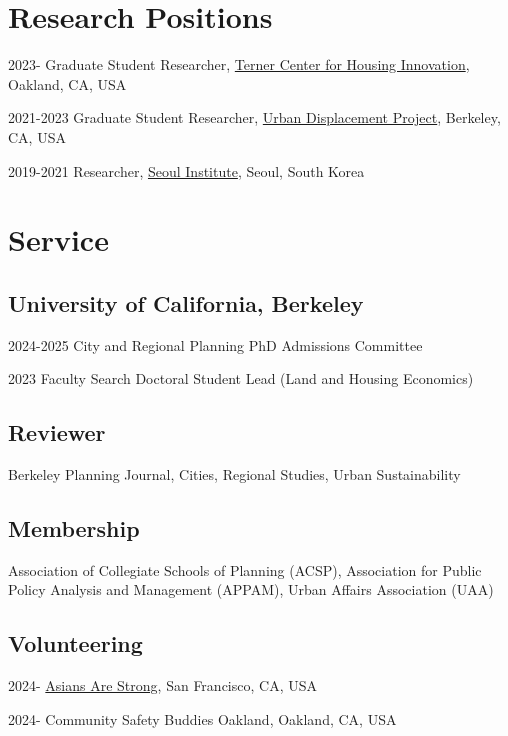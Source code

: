 \documentclass[12pt,letterpaper]{report}
\begin{document}
  \section*{Research Positions}
    \begin{tablist}
        \item[2023-] \tab{}Graduate Student Researcher, \href{https://ternercenter.berkeley.edu/}{Terner Center for Housing Innovation}, Oakland, CA, USA
        \item[2021-2023] \tab{}Graduate Student Researcher, \href{https://www.urbandisplacement.org/}{Urban Displacement Project}, Berkeley, CA, USA
        \item[2019-2021] \tab{}Researcher, \href{si.re.kr}{Seoul Institute}, Seoul, South Korea
    \end{tablist}

  \section*{Service}
  \subsection*{University of California, Berkeley}
    \begin{tablist}
        \item[2024-2025] \tab{}City and Regional Planning PhD Admissions Committee
        \item[2023] \tab{}Faculty Search Doctoral Student Lead (Land and Housing Economics)
    \end{tablist}
  \subsection*{Reviewer}
    Berkeley Planning Journal, Cities, Regional Studies, Urban Sustainability
  \subsection*{Membership}
    Association of Collegiate Schools of Planning (ACSP), Association for Public Policy Analysis and Management (APPAM), Urban Affairs Association (UAA)
  \subsection*{Volunteering}
    \begin{tablist}
        \item[2024-] \tab{}\href{https://asiansarestrong.org/}{Asians Are Strong}, San Francisco, CA, USA
        \item[2024-] \tab{}Community Safety Buddies Oakland, Oakland, CA, USA
    \end{tablist}
\end{document}
